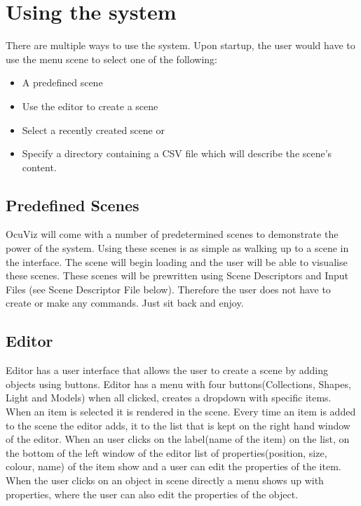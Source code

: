 \documentclass[a4paper,12pt]{article}
\begin{document}
\section{Using the system}

There are multiple ways to use the system. Upon startup, the user would have to use the menu scene to select one of the following:

\begin{itemize}
\item A predefined scene
\item Use the editor to create a scene
\item Select a recently created scene or
\item Specify a directory containing a CSV file which will describe the scene's content.
\end{itemize}

\subsection{Predefined Scenes}

OcuViz will come with a number of predetermined scenes to demonstrate the power of the system. Using these scenes is as simple as walking up to a scene in the interface. The scene will begin loading and the user will be able to visualise these scenes. These scenes will be prewritten using Scene Descriptors and Input Files (see Scene Descriptor File below). Therefore the user does not have to create or make any commands. Just sit back and enjoy.

\subsection{Editor}

Editor has a user interface that allows the user to create a scene by adding objects using buttons. Editor has a menu with four buttons(Collections, Shapes, Light and Models) when all clicked, creates a dropdown with specific items. 
When an item is selected it is rendered in the scene. Every time an item is added to the scene the editor adds, it to the list that is kept on the right hand window of the editor.
 When an user clicks on the label(name of the item) on the list, on the bottom of the left window of the editor list of properties(position, size, colour, name) of the item show and a user can edit the properties of the item. 
When the user clicks on an object in scene directly a menu shows up with properties, where the user can also edit the properties of the object.
\end{document}
